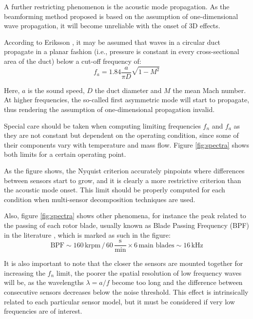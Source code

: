 A further restricting phenomenon is the acoustic mode propagation. As the beamforming method proposed is based on the assumption of one-dimensional wave propagation, it will become unreliable with the onset of 3D effects.

According to Eriksson \cite{eriksson1980higher}, it may be assumed that waves in a circular duct propagate in a planar fashion (i.e., pressure is constant in every cross-sectional area of the duct) below a cut-off frequency of:
\begin{equation}\label{eq:f_modes}
f_a = 1.84 \frac{a}{\pi D}\sqrt{1-M^2}
\end{equation}

Here, $a$ is the sound speed, $D$ the duct diameter and $M$ the mean Mach number. At higher frequencies, the so-called first asymmetric mode will start to propagate, thus rendering the assumption of one-dimensional propagation invalid.

Special care should be taken when computing limiting frequencies $f_n$ and $f_a$ as they are not constant but dependent on the operating condition, since some of their components vary with temperature and mass flow. Figure \ref{fig:spectra} shows both limits for a certain operating point.

As the figure shows, the Nyquist criterion accurately pinpoints where differences between sensors start to grow, and it is clearly a more restrictive criterion than the acoustic mode onset. This limit should be properly computed for each condition when multi-sensor decomposition techniques are used.

Also, figure \ref{fig:spectra} shows other phenomena, for instance the peak related to the passing of each rotor blade, usually known as Blade Passing Frequency (BPF) in the literature \cite{raitor2008sound}, which is marked as such in the figure:
\begin{equation}
  \text{BPF} \sim 160\,\text{krpm}\,/\,60\,\frac{\text{s}}{\text{min}} \times 6\,\text{main blades} \sim 16\,\text{kHz}
\end{equation}

It is also important to note that the closer the sensors are mounted together for increasing the $f_n$ limit, the poorer the spatial resolution of low frequency waves will be, as the wavelengths $\lambda=a/f$ become too long and the difference between consecutive sensors decreases below the noise threshold. This effect is intrinsically related to each particular sensor model, but it must be considered if very low frequencies are of interest.


